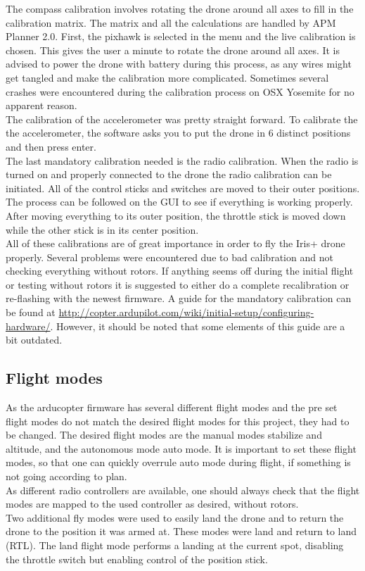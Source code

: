 The compass calibration involves rotating the drone around all axes to fill in the calibration
matrix. The matrix and all the calculations are handled by APM Planner 2.0. First, the pixhawk is
selected in the menu and the live calibration is chosen. This gives the user a minute to rotate the
drone around all axes. It is advised to power the drone with battery during this process,
as any wires might get tangled
and make the calibration more complicated.
Sometimes several crashes were encountered during the
calibration process on OSX Yosemite for no apparent reason.\\

The calibration of the accelerometer was pretty straight forward. To calibrate the the
accelerometer, the software asks you to put the drone in 6 distinct positions and then press enter.\\

The last mandatory calibration needed is the radio calibration. When the radio is turned on and
properly connected to the drone the radio calibration can be initiated. All of the control sticks
and switches are moved to their outer positions. The process can be followed on the GUI to see if
everything is working properly. After moving everything to its outer position, the throttle stick is
moved down while the other stick is in its center position.\\

All of these calibrations are of great importance in order to fly the Iris+ drone properly. Several
problems were encountered due to bad calibration and not checking everything without rotors. If
anything seems off during the initial flight or testing without rotors it is suggested to either do
a complete recalibration or re-flashing with the newest firmware. A guide for the mandatory
calibration can be found at
\url{http://copter.ardupilot.com/wiki/initial-setup/configuring-hardware/}.
However, it should be noted that some elements of this guide are a bit outdated.

\subsection*{Flight modes}
As the arducopter firmware has several different flight modes and the pre set flight modes do not
match the desired flight modes for this project, they had to be changed.
The desired flight modes
are the manual modes stabilize and altitude,
and the autonomous mode auto mode.
It is important
to set these flight modes, so that one can quickly overrule auto mode during flight,
if something is not going according to plan.\\
As different radio controllers are available, one should always check that the flight modes are
mapped to the used controller as desired, without rotors.\\
Two additional fly modes were used to easily land the drone and to return the drone to the position
it was armed at. These modes were land and return to land (RTL). The land flight mode performs a
landing at the current spot, disabling the throttle switch but enabling control of the position
stick.

